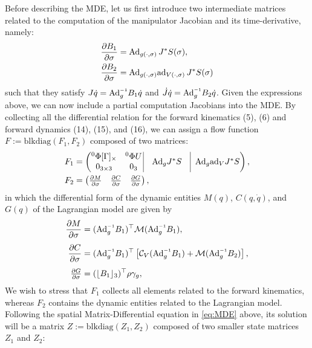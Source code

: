 Before describing the MDE, let us first introduce two intermediate matrices related to the computation of the manipulator Jacobian and its time-derivative, namely:
%
\begin{align}
\frac{\partial B_1}{\partial \sigma} & = \text{Ad}_{g(\cdot,\sigma)}\, J^* S(\sigma), \\
\frac{\partial B_2}{\partial \sigma} & = \text{Ad}_{g(\cdot,\sigma)}\text{ad}_{V(\cdot,\sigma)}\, J^* S(\sigma)
\end{align}
%
such that they satisfy $J\dot{q} = \Ad_g\inv B_1 \dot{q}$ and $ \dot{J} \dot{q} = \Ad_g\inv B_2 \dot{q}$. Given the expressions above, we can now include a partial computation Jacobians into the MDE. By collecting all the differential relation for the forward kinematics (5), (6) and forward dynamics (14), (15), and (16), we can assign a flow function $F:= \text{blkdiag}\left(F_1,F_2 \right)$ composed of two matrices:
%
\begin{align}
F_1 & = \begin{pmatrix}
\begin{matrix}
^0 \Phi [\Gamma]_\times & ^0 \Phi U \\ 0_{3\times3} & 0_3
\end{matrix} \, \vrule & \Ad_g J^*S &\vrule\;\; \Ad_g \ad_{V} J^* S
 \end{pmatrix}, \\
F_2 & = \begin{pmatrix}
\frac{\p M}{\p \sigma} & \frac{\p C}{\p \sigma} & \frac{\p G}{\p \sigma}  \end{pmatrix},
\end{align}
in which the differential form of the dynamic entities $M(q)$, $C(q,\dot{q})$, and $G(q)$ of the Lagrangian model are given by
%
\begin{align}
\frac{\p M}{\p \sigma} & = (\Ad_{g}\inv B_1)^\top \mathcal{M} (\Ad_{g}\inv B_1), \\[0.4em]
\frac{\p C}{\p \sigma} & = (\Ad_{g}\inv B_1)^\top \left[\mathcal{C}_V (\Ad_{g}\inv B_1) + \mathcal{M} (\Ad_{g}\inv B_2) \right], \\[0.4em]
\tfrac{\p G}{\p \sigma} & = (\floor{B_{1}}_3)^\top \rho \gamma_g,
\end{align}
%
We wish to stress that $F_1$ collects all elements related to the forward kinematics, whereas $F_2$ contains the dynamic entities related to the Lagrangian model. Following the spatial Matrix-Differential equation in \eqref{eq:MDE} above, its solution will be a matrix $Z := \text{blkdiag}\left( Z_1,Z_2 \right)$ composed of two smaller state matrices $Z_1$ and $Z_2$:
